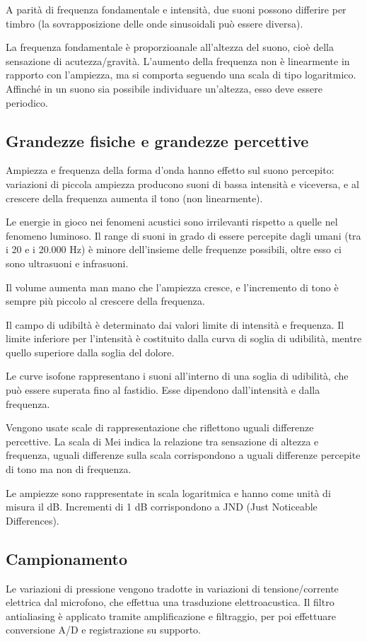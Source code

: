 A parità di frequenza fondamentale e intensità, due suoni possono differire per timbro (la sovrapposizione delle onde sinusoidali può essere diversa).

La frequenza fondamentale è proporzioanale all'altezza del suono, cioè della sensazione di acutezza/gravità. L'aumento della frequenza non è linearmente in rapporto con l'ampiezza, ma si comporta seguendo una scala di tipo logaritmico. Affinché in un suono sia possibile individuare un'altezza, esso deve essere periodico. 

\subsection{Grandezze fisiche e grandezze percettive}
Ampiezza e frequenza della forma d'onda hanno effetto sul suono percepito: variazioni di piccola ampiezza producono suoni di bassa intensità e viceversa, e al crescere della frequenza aumenta il tono (non linearmente).

Le energie in gioco nei fenomeni acustici sono irrilevanti rispetto a quelle nel fenomeno luminoso. Il range di suoni in grado di essere percepite dagli umani (tra i 20 e i 20.000 Hz) è minore dell'insieme delle frequenze possibili, oltre esso ci sono ultrasuoni e infrasuoni. 

Il volume aumenta man mano che l'ampiezza cresce, e l'incremento di tono è sempre più piccolo al crescere della frequenza.

Il campo di udibiltà è determinato dai valori limite di intensità e frequenza. Il limite inferiore per l'intensità è costituito dalla curva di soglia di udibilità, mentre quello superiore dalla soglia del dolore. 

Le curve isofone rappresentano i suoni all'interno di una soglia di udibilità, che può essere superata fino al fastidio. Esse dipendono dall'intensità e dalla frequenza.

Vengono usate scale di rappresentazione che riflettono uguali differenze percettive. La scala di Mei indica la relazione tra sensazione di altezza e frequenza, uguali differenze sulla scala corrispondono a uguali differenze percepite di tono ma non di frequenza.

Le ampiezze sono rappresentate in scala logaritmica e hanno come unità di misura il dB. Incrementi di 1 dB corrispondono a JND (Just Noticeable Differences).

\subsection{Campionamento}
Le variazioni di pressione vengono tradotte in variazioni di tensione/corrente elettrica dal microfono, che effettua una trasduzione elettroacustica. Il filtro antialiasing è applicato tramite amplificazione e filtraggio, per poi effettuare conversione A/D e registrazione su supporto.

